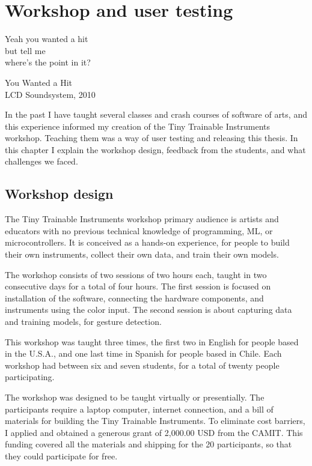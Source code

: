 \chapter{Workshop and user testing}

\epigraph{Yeah you wanted a hit \\ but tell me \\ where's the point in it?}{You Wanted a Hit \\ LCD Soundsystem, 2010}

In the past I have taught several classes and crash courses of software of arts, and this experience informed my creation of the Tiny Trainable Instruments workshop. Teaching them was a way of user testing and releasing this thesis. In this chapter I explain the workshop design, feedback from the students, and what challenges we faced.

\section{Workshop design}

The Tiny Trainable Instruments workshop primary audience is artists and educators with no previous technical knowledge of programming, \acrshort{ML}, or microcontrollers. It is conceived as a hands-on experience, for people to build their own instruments, collect their own data, and train their own models.

The workshop consists of two sessions of two hours each, taught in two consecutive days for a total of four hours. The first session is focused on installation of the software, connecting the hardware components, and instruments using the color input. The second session is about capturing data and training models, for gesture detection.

This workshop was taught three times, the first two in English for people based in the U.S.A., and one last time in Spanish for people based in Chile. Each workshop had between six and seven students, for a total of twenty people participating.

The workshop was designed to be taught virtually or presentially. The participants require a laptop computer, internet connection, and a bill of materials for building the Tiny Trainable Instruments. To eliminate cost barriers, I applied and obtained a generous grant of 2,000.00 USD from the \acrlong{CAMIT}. This funding covered all the materials and shipping for the 20 participants, so that they could participate for free.


